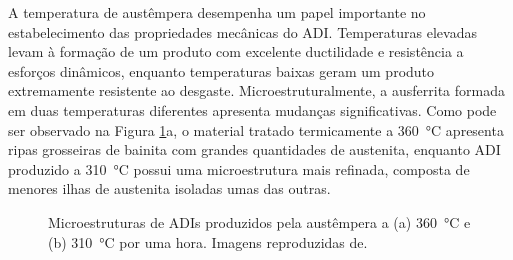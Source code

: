 A temperatura de austêmpera desempenha um papel importante no estabelecimento das propriedades mecânicas do ADI. Temperaturas elevadas levam à formação de um produto com excelente ductilidade e resistência a esforços dinâmicos, enquanto temperaturas baixas geram um produto extremamente resistente ao desgaste\cite{Lin1996,Aranzabal1997,Magalhaes1998}. Microestruturalmente, a ausferrita formada em duas temperaturas diferentes apresenta mudanças significativas. Como pode ser observado na Figura \ref{fig:ADIs}a, o material tratado termicamente a \SI{360}{\degreeCelsius} apresenta ripas grosseiras de bainita com grandes quantidades de austenita, enquanto ADI produzido a \SI{310}{\degreeCelsius} possui uma microestrutura mais refinada, composta de menores ilhas de austenita isoladas umas das outras.

\begin{figure}
  \quad
  \caption{Microestruturas de ADIs produzidos pela austêmpera a (a) \SI{360}{\degreeCelsius} e (b) \SI{310}{\degreeCelsius} por uma hora. Imagens reproduzidas de\cite{Trudel1997}.}
  \label{fig:ADIs}
\end{figure}

